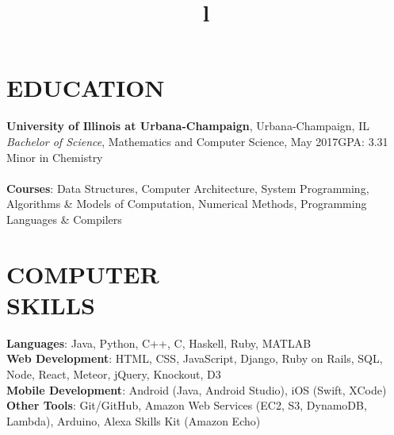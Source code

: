 \documentclass[margin]{res}
\begin{document}
\begin{resume}

\section{EDUCATION}
\textbf{University of Illinois at Urbana-Champaign}, Urbana-Champaign, IL\\
{\sl Bachelor of Science}, Mathematics and Computer Science, May 2017\hfill GPA: 3.31
\\
Minor in Chemistry
\\
\\
\textbf{Courses}: Data Structures, Computer Architecture, System Programming,
Algorithms \& Models of Computation, Numerical Methods, Programming Languages
\& Compilers


\section{COMPUTER\\SKILLS}

\textbf{Languages}: Java, Python, C++, C, Haskell, Ruby, MATLAB
\\
\textbf{Web Development}: HTML, CSS, JavaScript, Django, Ruby on Rails, SQL, Node,
                          React, Meteor, jQuery, Knockout, D3
\\
\textbf{Mobile Development}: Android (Java, Android Studio),
iOS (Swift, XCode)
\\
\textbf{Other Tools}: Git/GitHub, Amazon Web Services (EC2, S3, DynamoDB, Lambda),
Arduino, Alexa Skills Kit (Amazon Echo)

\begin{format}
\title{l}\\
\\
\body\\
\end{format}


\end{resume}
\end{document}
